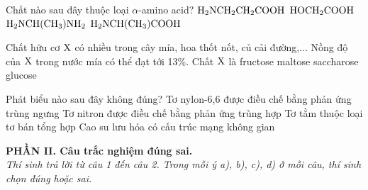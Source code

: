 \documentclass[11pt,a4paper]{article}
\begin{document}
\begin{ex}
Chất nào sau đây thuộc loại $\alpha$-amino acid?
\choice
{$\ce{H2NCH2CH2COOH}$}
{$\ce{HOCH2COOH}$}
{$\ce{H2NCH(CH3)NH2}$}
{\True $\ce{H2NCH(CH3)COOH}$}
\end{ex}
\begin{ex}
Chất hữu cơ $\ce{X}$ có nhiều trong cây mía, hoa thốt nốt, củ cải đường,... Nồng độ của $\ce{X}$ trong nước mía có thể đạt tới 13\%. Chất $\ce{X}$ là
\choice
{fructose}
{maltose}
{\True saccharose}
{glucose}
\end{ex}
\begin{ex}
Phát biểu nào sau đây không đúng?
\choice
{Tơ nylon-6,6 được điều chế bằng phản ứng trùng ngưng}
{Tơ nitron được điều chế bằng phản ứng trùng hợp}
{\True Tơ tằm thuộc loại tơ bán tổng hợp}
{Cao su lưu hóa có cấu trúc mạng không gian}
\end{ex}
\vspace{4pt}
\noindent
{\color{mainGreen}\textbf{\large PHẦN II. Câu trắc nghiệm đúng sai.}}\\
\textit{\small Thí sinh trả lời từ câu 1 đến câu 2. Trong mỗi ý a), b), c), d) ở mỗi câu, thí sinh chọn đúng hoặc sai.}
\vspace{2pt}
\end{document}
